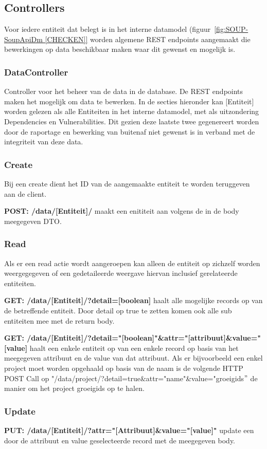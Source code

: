 \subsection{Controllers}\label{subsec:controllers}
Voor iedere entiteit dat belegt is in het interne datamodel (figuur~\ref{fig:SOUP-SoupApiDm [CHECKEN]} worden algemene REST endpoints aangemaakt die bewerkingen op data beschikbaar maken waar dit gewenst en mogelijk is.
\subsubsection{DataController}
Controller voor het beheer van de data in de database. De REST endpoints maken het mogelijk om data te bewerken. In de secties hieronder kan [Entiteit] worden gelezen als alle Entiteiten in het interne datamodel, met als uitzondering Dependencies en Vulnerabilities. Dit gezien deze laatste twee gegenereert worden door de raportage en bewerking van buitenaf niet gewenst is in verband met de integriteit van deze data.
\subsubsection*{Create}
Bij een create dient het ID van de aangemaakte entiteit te worden teruggeven aan de client.

\textbf{POST: /data/[Entiteit]/} maakt een enititeit aan volgens de in de body meegegeven DTO.

\subsubsection*{Read}
Als er een read actie wordt aangeroepen kan alleen de entiteit op zichzelf worden weergegegeven of een gedetaileerde weergave hiervan inclusief gerelateerde entiteiten.

\textbf{GET: /data/[Entiteit]/?detail=[boolean]} haalt alle mogelijke records op van de betreffende entiteit. Door detail op true te zetten komen ook alle sub entiteiten mee met de return body.

\textbf{GET: /data/[Entiteit]/?detail="[boolean]"\&attr="[attribuut]\&value="[value]} haalt een enkele entiteit op van een enkele record op basis van het meegegeven attribuut en de value van dat attribuut. Als er bijvoorbeeld een enkel project moet worden opgehaald op basis van de naam is de volgende HTTP POST Call op "/data/project/?detail=true&attr="name"&value="groeigids$"$ de manier om het project groeigids op te halen.

\subsubsection*{Update}
\textbf{PUT: /data/[Entiteit]/?attr="[Attribuut]\&value="[value]"} update een door de attribuut en value geselecteerde record met de meegegeven body.
